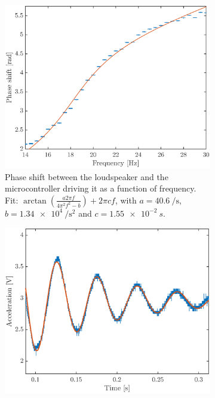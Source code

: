 \documentclass[12pt,oneside,a4paper]{article}
\numberwithin{equation}{section}
\begin{document}
{{{{\begin{figure}[h]
	\centering
	\begin{subfigure}[t]{0.49\textwidth}
		\includegraphics[width=\textwidth]{pshiftplot.eps} 
		\caption{Phase shift between the loudspeaker and the microcontroller 
		driving it as a function of frequency. Fit:  $\arctan 
		\left(\frac{a 2\pi 
		f}{4\pi^2f^2-b}\right)+2\pi c f$, 
		with $a=\SI{40.6}{\per\second}$, 
		$b=\SI{1.34e4}{\per\second\squared}$ 
		and $c=\SI{1.55e-2}{s}$.}
		\label{phaseshift_plot}
	\end{subfigure} \hfill 
	\begin{subfigure}[t]{0.49\textwidth}
		\centering
		\includegraphics[width=\textwidth]{ringout.eps}

\end{subfigure}
\end{figure}}}}}
\end{document}
